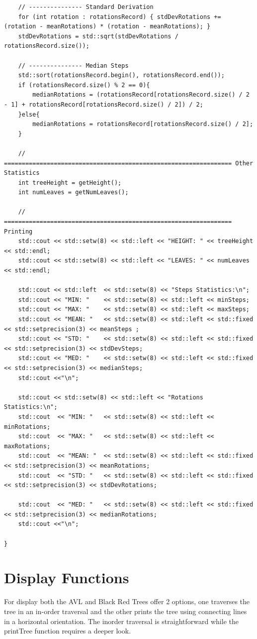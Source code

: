 \documentclass[12pt, a4paper]{report}
\begin{document}
\begin{verbatim}
    // --------------- Standard Derivation
    for (int rotation : rotationsRecord) { stdDevRotations += (rotation - meanRotations) * (rotation - meanRotations); }
    stdDevRotations = std::sqrt(stdDevRotations / rotationsRecord.size());

    // --------------- Median Steps    
    std::sort(rotationsRecord.begin(), rotationsRecord.end());
    if (rotationsRecord.size() % 2 == 0){
        medianRotations = (rotationsRecord[rotationsRecord.size() / 2 - 1] + rotationsRecord[rotationsRecord.size() / 2]) / 2;
    }else{
        medianRotations = rotationsRecord[rotationsRecord.size() / 2];
    }

    // ================================================================ Other Statistics
    int treeHeight = getHeight();
    int numLeaves = getNumLeaves();

    // ================================================================ Printing
    std::cout << std::setw(8) << std::left << "HEIGHT: " << treeHeight  << std::endl;    
    std::cout << std::setw(8) << std::left << "LEAVES: " << numLeaves   << std::endl;

    std::cout << std::left  << std::setw(8) << "Steps Statistics:\n";
    std::cout << "MIN: "    << std::setw(8) << std::left << minSteps;
    std::cout << "MAX: "    << std::setw(8) << std::left << maxSteps;
    std::cout << "MEAN: "   << std::setw(8) << std::left << std::fixed << std::setprecision(3) << meanSteps ;
    std::cout << "STD: "    << std::setw(8) << std::left << std::fixed << std::setprecision(3) << stdDevSteps;
    std::cout << "MED: "    << std::setw(8) << std::left << std::fixed << std::setprecision(3) << medianSteps;
    std::cout <<"\n";

    std::cout << std::setw(8) << std::left << "Rotations Statistics:\n";
    std::cout  << "MIN: "   << std::setw(8) << std::left << minRotations;
    std::cout  << "MAX: "   << std::setw(8) << std::left << maxRotations;
    std::cout  << "MEAN: "  << std::setw(8) << std::left << std::fixed << std::setprecision(3) << meanRotations;
    std::cout  << "STD: "   << std::setw(8) << std::left << std::fixed << std::setprecision(3) << stdDevRotations;
    
    std::cout  << "MED: "   << std::setw(8) << std::left << std::fixed << std::setprecision(3) << medianRotations;
    std::cout <<"\n";

}
\end{verbatim}
\section{Display Functions}
For display both the AVL and Black Red Trees offer 2 options, one traverses the tree in an in-order traversal and the other prints the tree using connecting lines in a horizontal orientation. The inorder traversal is straightforward while the printTree function requires a deeper look.
\end{document}
